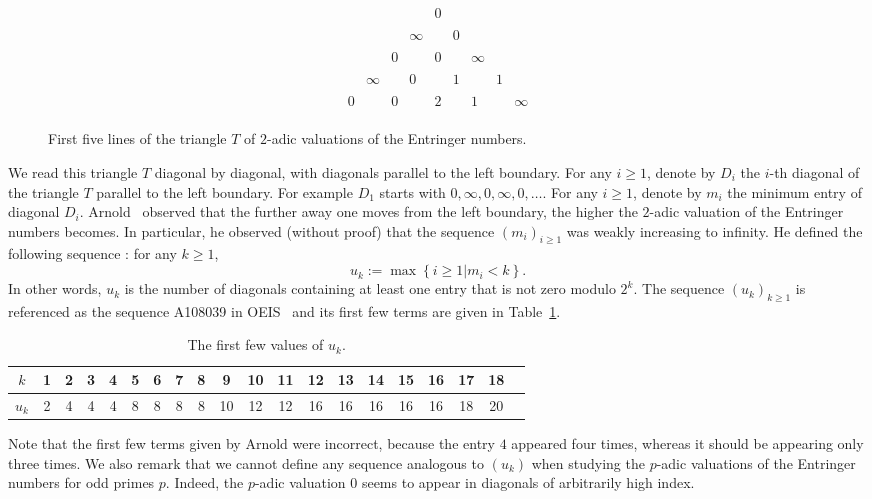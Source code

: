 \documentclass[12pt]{amsart}
\begin{document}
\begin{figure}[htpb]
\[
\begin{matrix}
&&&&0&&&& \\
&&&&&&&& \\
&&&\infty&&0&&& \\
&&&&&&&& \\
&&0&&0&&\infty&& \\
&&&&&&&& \\
&\infty&&0&&1&&1& \\
&&&&&&&& \\
0&&0&&2&&1&&\infty \\
\end{matrix}
\]
\caption{First five lines of the triangle $T$ of $2$-adic valuations of the Entringer numbers.}
\label{fig:2valuationtriangle}
\end{figure}
We read this triangle $T$ diagonal by diagonal, with diagonals parallel to the left boundary. For any $i\geq1$, denote by $D_i$ the $i$-th diagonal of the triangle $T$ parallel to the left boundary. For example $D_1$ starts with $0,\infty,0,\infty,0,\ldots$. For any $i\geq1$, denote by $m_i$ the minimum entry of diagonal $D_i$. Arnold~\cite{A91} observed that the further away one moves from the left boundary, the higher the $2$-adic valuation of the Entringer numbers becomes. In particular, he observed (without proof) that the sequence $(m_i)_{i\geq1}$ was weakly increasing to infinity. He defined the following sequence : for any $k \geq 1$,
\[
u_k:=\max \left\{i\geq1 | m_i < k \right\}.
\]
In other words, $u_k$ is the number of diagonals containing at least one entry that is not zero modulo $2^k$. The sequence $(u_k)_{k\geq1}$ is referenced as the sequence A108039 in OEIS~\cite{OEIS} and its first few terms are given in Table~\ref{tab:firstterms}.

\begin{table}[htbp]
\centering
\begin{tabular}{|c|c|c|c|c|c|c|c|c|c|c|c|c|c|c|c|c|c|c|c|}
  \hline
  $k$  & 1& 2 & 3 & 4 & 5 & 6 & 7 & 8 & 9 & 10 & 11 & 12 & 13 & 14 & 15 & 16 & 17 & 18 \\
  \hline
  $u_k$ & 2 & 4 & 4 & 4 & 8 & 8 & 8 & 8 & 10 & 12 & 12 & 16 & 16 & 16 & 16 & 16 & 18 & 20 \\
  \hline
\end{tabular}
\caption{The first few values of $u_k$.}
\label{tab:firstterms}
\end{table}

Note that the first few terms given by Arnold were incorrect, because the entry $4$ appeared four times, whereas it should be appearing only three times. We also remark that we cannot define any sequence analogous to $(u_k)$ when studying the $p$-adic valuations of the Entringer numbers for odd primes $p$. Indeed, the $p$-adic valuation $0$ seems to appear in diagonals of arbitrarily high index.
\end{document}

